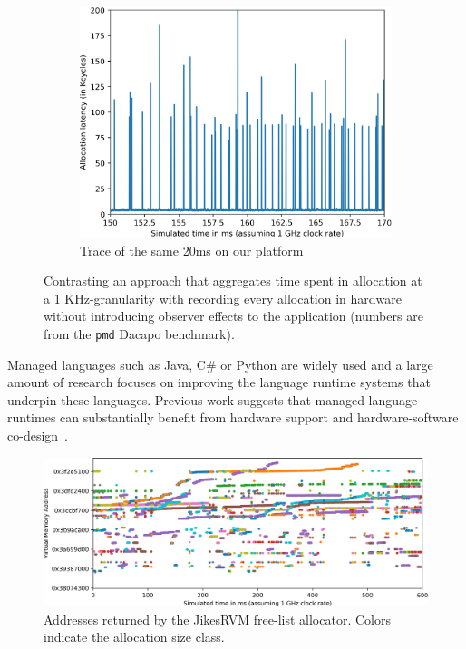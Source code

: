 \begin{figure}
\begin{subfigure}[t]{0.32\textwidth}
		\includegraphics[width=\textwidth]{results/java-alloc-detailed.png}
		\caption{Trace of the same 20ms on our platform}
	\end{subfigure}
	\caption{Contrasting an approach that aggregates time spent in allocation at a 1 KHz-granularity with recording every allocation in hardware without introducing observer effects to the application (numbers are from the \texttt{pmd} Dacapo benchmark).}
	\label{fig:java_alloc}
\end{figure}

Managed languages such as Java, C\# or Python are widely used and a large
amount of research focuses on improving the language runtime systems that
underpin these languages. Previous work suggests that managed-language runtimes
can substantially benefit from hardware support and hardware-software
co-design~\cite{Click:2005:PGA:1064979.1064988,Wright:2005:OMA:1698178,Ungar:1984:ASS:800015.808182,Joao:2009:FRH:1555754.1555806}.


\begin{figure}[t]
		\centering
		\includegraphics[width=\columnwidth]{results/heatmap.png}
		\caption{Addresses returned by the JikesRVM free-list allocator. Colors indicate the allocation size class.}
		\label{fig:java_alloc_heatmap}
\end{figure}

